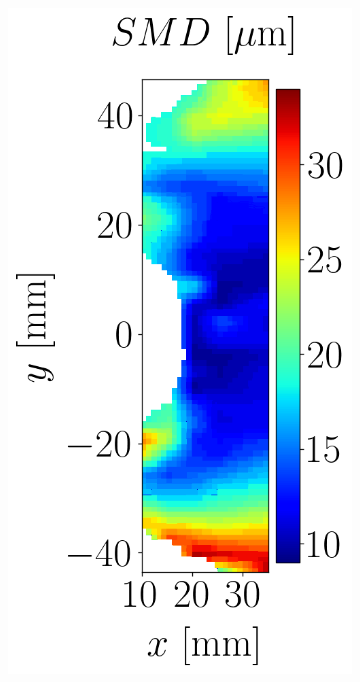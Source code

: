 \begin{figure}[h!]
\flushleft
\begin{subfigure}[b]{0.45\textwidth}
	\centering
   \includegraphics[scale=0.4]{./part3_applications/figures_ch9_lagrangian/expe_maps/SMD_map.png}
\end{subfigure}

\end{figure}
